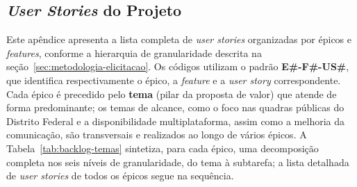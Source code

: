 \begin{apendicesenv}
\chapter{\textit{User Stories} do Projeto}
    \label{apendice:us}
    Este apêndice apresenta a lista completa de \textit{user stories} organizadas por épicos e \textit{features}, conforme a hierarquia de granularidade descrita na seção~\ref{sec:metodologia-elicitacao}. Os códigos utilizam o padrão \textbf{E\#-F\#-US\#}, que identifica respectivamente o épico, a \textit{feature} e a \textit{user story} correspondente. Cada épico é precedido pelo \textbf{tema} (pilar da proposta de valor) que atende de forma predominante; os temas de alcance, como o foco nas quadras públicas do Distrito Federal e a disponibilidade multiplataforma, assim como a melhoria da comunicação, são transversais e realizados ao longo de vários épicos. A Tabela~\ref{tab:backlog-temas} sintetiza, para cada épico, uma decomposição completa nos seis níveis de granularidade, do tema à subtarefa; a lista detalhada de \textit{user stories} de todos os épicos segue na sequência.


\end{apendicesenv}
